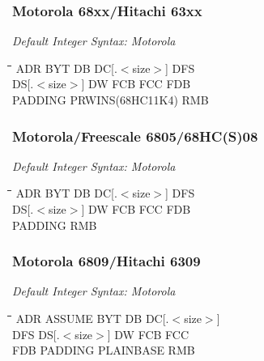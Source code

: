 \subsubsection{Motorola 68xx/Hitachi 63xx}

{\em Default Integer Syntax: Motorola}

{\tt\begin{tabbing}
\hspace{3cm}\=\hspace{3cm}\=\hspace{3cm}\=\hspace{3cm}\=\kill
ADR        \> BYT         \> DB          \> DC[.$<$size$>$] \> DFS     \\
DS[.$<$size$>$] \> DW     \> FCB         \> FCC         \> FDB         \\
PADDING     \> PRWINS(68HC11K4) \> RMB \\
\end{tabbing}}

\subsubsection{Motorola/Freescale 6805/68HC(S)08}

{\em Default Integer Syntax: Motorola}

{\tt\begin{tabbing}
\hspace{3cm}\=\hspace{3cm}\=\hspace{3cm}\=\hspace{3cm}\=\kill
ADR        \> BYT         \> DB          \> DC[.$<$size$>$] \> DFS     \\
DS[.$<$size$>$] \> DW     \> FCB         \> FCC         \> FDB         \\
PADDING     \> RMB \\
\end{tabbing}}

\subsubsection{Motorola 6809/Hitachi 6309}

{\em Default Integer Syntax: Motorola}

{\tt\begin{tabbing}
\hspace{3cm}\=\hspace{3cm}\=\hspace{3cm}\=\hspace{3cm}\=\kill
ADR        \> ASSUME      \> BYT         \> DB          \> DC[.$<$size$>$] \\
DFS        \> DS[.$<$size$>$] \> DW      \> FCB         \> FCC \\
FDB        \> PADDING     \> PLAINBASE   \> RMB \\
\end{tabbing}}

